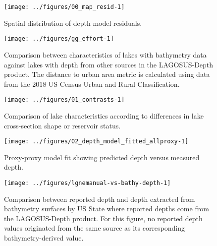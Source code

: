 \documentclass[draft,wrr]{agutexSI2019}
\begin{document}
\begin{figure}
      \begin{center}
            \texttt{[image: ../figures/00\_map\_resid-1]}
      \end{center}
      \caption{Spatial distribution of depth model residuals.}\label{figS6}
\end{figure}
\clearpage


\begin{figure}
      \begin{center}\texttt{[image: ../figures/gg\_effort-1]}\end{center}
      \caption{Comparison between characteristics of lakes with bathymetry data against lakes with depth from other sources in the LAGOSUS-Depth product. The distance to urban area metric is calculated using data from the 2018 US Census Urban and Rural Classification.}\label{figS7}
\end{figure}

\clearpage
\begin{figure}
      \begin{center}\texttt{[image: ../figures/01\_contrasts-1]}\end{center}
      \caption{Comparison of lake characteristics according to differences in lake cross-section shape or reservoir status.}\label{figS8}
\end{figure}

\clearpage
\begin{figure}
      \begin{center}\texttt{[image: ../figures/02\_depth\_model\_fitted\_allproxy-1]}\end{center}
      \caption{Proxy-proxy model fit showing predicted depth versus measured depth.}\label{figS9}
\end{figure}

\clearpage

\begin{figure}
      \begin{center}\texttt{[image: ../figures/lgnemanual-vs-bathy-depth-1]}\end{center}
      \caption{Comparison between reported depth and depth extracted from bathymetry surfaces by US State where reported depths come from the LAGOSUS-Depth product. For this figure, no reported depth values originated from the same source as its corresponding bathymetry-derived value.}\label{figS10}
\end{figure}
\end{document}
